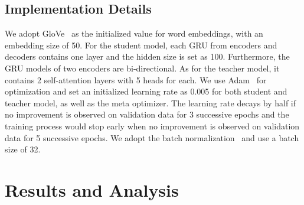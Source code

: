 \documentclass[letterpaper]{article} %
\begin{document}
    

\subsection*{Implementation Details}
We adopt GloVe~\citep{pennington2014glove} as the initialized value for word embeddings, with an embedding size of 50. For the student model, each GRU from encoders and decoders contains one layer and the hidden size is set as 100. Furthermore, the GRU models of two encoders are bi-directional. As for the teacher model, it contains 2 self-attention layers with 5 heads for each. We use Adam~\citep{kingma2014adam} for optimization and set an initialized learning rate as 0.005 for both student and teacher model, as well as the meta optimizer. The learning rate decays by half if no improvement is observed on validation data for 3 successive epochs and the training process would stop early when no improvement is observed on validation data for 5 successive epochs. We adopt the batch normalization~\citep{ioffe2015batch} and use a batch size of 32.







    
    
\section*{Results and Analysis}
\end{document}
